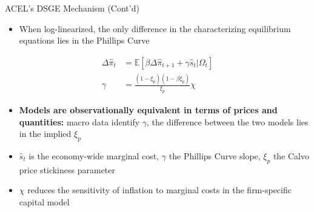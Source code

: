 \documentclass[11pt]{beamer}
\begin{document}

\begin{frame}{ACEL's DSGE Mechanism (Cont'd)}
\begin{itemize}
    \item When log-linearized, the only difference in the characterizing equilibrium equations lies in the Phillips Curve
\end{itemize}

\begin{align}
    \Delta\hat{\pi}_t &= \mathbb{E} [\beta\Delta\hat{\pi}_{t+1} + \gamma\hat{s}_t|\Omega_t]
    \label{eq:Phillips_Curve}
    \\
    \gamma &= \frac{(1-\xi_p)(1-\beta\xi_p)}{\xi_p}\chi
    \label{eq:Phillips_Curve_Slope}
\end{align}

\begin{itemize}
    \item \textbf{Models are observationally equivalent in terms of prices and quantities:} \textcolor{PadovaRed}{macro data identify $\gamma$, the difference between the two models lies in the implied $\xi_p$}
    \item {\small $\hat{s}_t$ is the economy-wide marginal cost, $\gamma$ the Phillips Curve slope, $\xi_p$ the Calvo price stickiness parameter}
    \item {\small $\chi$ reduces the sensitivity of inflation to marginal costs in the firm-specific capital model}
\end{itemize}
\end{frame}

\end{document}
